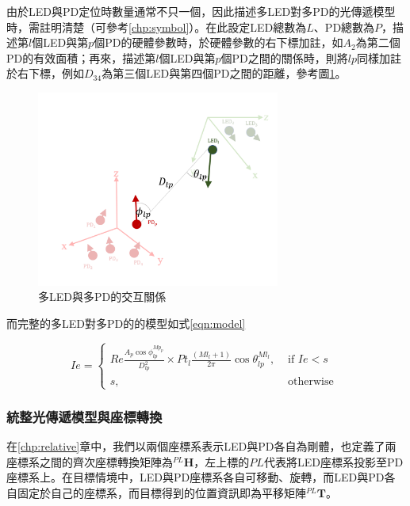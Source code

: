     由於LED與PD定位時數量通常不只一個，因此描述多LED對多PD的光傳遞模型時，需註明清楚（可參考\ref{chp:symbol}）。在此設定LED總數為$L$、PD總數為$P$，描述第$l$個LED與第$p$個PD的硬體參數時，於硬體參數的右下標加註，如$A_2$為第二個PD的有效面積；再來，描述第$l$個LED與第$p$個PD之間的關係時，則將$lp$同樣加註於右下標，例如$D_{34}$為第三個LED與第四個PD之間的距離，參考圖\ref{pic:interactive_mul}。
    
    \begin{figure}[ht]
        \centering
        \includegraphics[width=8cm]{ch2pic/interactive_mul.png}
        \caption{多LED與多PD的交互關係}
        \label{pic:interactive_mul}
    \end{figure}

    而完整的多LED對多PD的的模型如式\ref{eqn:model}
    
    \begin{equation}
        \label{eqn:model}
        Ie = \begin{cases}Re \frac{ A_p\cos\phi_{lp}^{Mp_{p}} }{D^2_{lp}}\times Pt_l\frac{(Ml_{l}+1)}{2 \pi} \cos \theta_{lp}^{Ml_{l}}, & \text { if } Ie<s \\ s, & \text { otherwise }\end{cases}
    \end{equation}




    \subsubsection{統整光傳遞模型與座標轉換}
    \label{chp:model_transform}

    在\ref{chp:relative}章中，我們以兩個座標系表示LED與PD各自為剛體，也定義了兩座標系之間的齊次座標轉換矩陣為$^{PL}\boldsymbol{H}$，左上標的$PL$代表將LED座標系投影至PD座標系上。在目標情境中，LED與PD座標系各自可移動、旋轉，而LED與PD各自固定於自己的座標系，而目標得到的位置資訊即為平移矩陣$^{PL}\boldsymbol{T}$。

